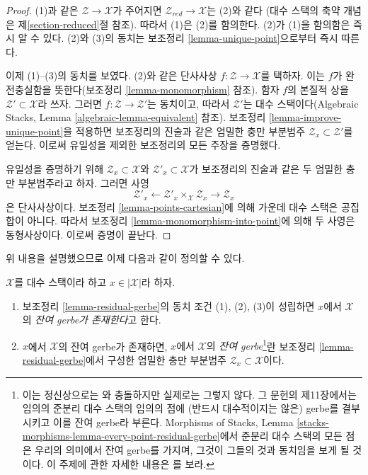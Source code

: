 \begin{proof}
(1)과 같은 $\mathcal{Z} \to \mathcal{X}$가 주어지면
$\mathcal{Z}_{red} \to \mathcal{X}$는 (2)와 같다
(대수 스택의 축약 개념은 제\ref{section-reduced}절 참조).
따라서 (1)은 (2)를 함의한다. (2)가 (1)을 함의함은 즉시 알 수 있다.
(2)와 (3)의 동치는 보조정리 \ref{lemma-unique-point}으로부터 즉시 따른다.

\medskip\noindent
이제 (1)--(3)의 동치를 보였다. (2)와 같은 단사사상
$f : \mathcal{Z} \to \mathcal{X}$를 택하자. 이는 $f$가 완전충실함을
뜻한다(보조정리 \ref{lemma-monomorphism} 참조).
함자 $f$의 본질적 상을 $\mathcal{Z}' \subset \mathcal{X}$라 쓰자.
그러면 $f : \mathcal{Z} \to \mathcal{Z}'$는 동치이고, 따라서
$\mathcal{Z}'$는 대수 스택이다(Algebraic Stacks,
Lemma \ref{algebraic-lemma-equivalent} 참조).
보조정리 \ref{lemma-improve-unique-point}을 적용하면 보조정리의 진술과 같은
엄밀한 충만 부분범주 $\mathcal{Z}_x \subset \mathcal{Z}'$를 얻는다.
이로써 유일성을 제외한 보조정리의 모든 주장을 증명했다.

\medskip\noindent
유일성을 증명하기 위해 $\mathcal{Z}_x \subset \mathcal{X}$와
$\mathcal{Z}'_x \subset \mathcal{X}$가 보조정리의 진술과 같은
두 엄밀한 충만 부분범주라고 하자. 그러면 사영
$$
\mathcal{Z}'_x
\longleftarrow
\mathcal{Z}'_x \times_\mathcal{X} \mathcal{Z}_x
\longrightarrow
\mathcal{Z}_x
$$
은 단사사상이다. 보조정리 \ref{lemma-points-cartesian}에 의해
가운데 대수 스택은 공집합이 아니다. 따라서 보조정리
\ref{lemma-monomorphism-into-point}에 의해 두 사영은 동형사상이다.
이로써 증명이 끝난다.
\end{proof}

\noindent
위 내용을 설명했으므로 이제 다음과 같이 정의할 수 있다.

\begin{definition}
\label{definition-residual-gerbe}
$\mathcal{X}$를 대수 스택이라 하고 $x \in |\mathcal{X}|$라 하자.
\begin{enumerate}
\item 보조정리 \ref{lemma-residual-gerbe}의 동치 조건 (1), (2), (3)이
성립하면 {$x$에서 $\mathcal{X}$의 \it 잔여 gerbe가 존재한다}고 한다.
\item $x$에서 $\mathcal{X}$의 잔여 gerbe가 존재하면,
{$x$에서 $\mathcal{X}$의 \it 잔여 gerbe}\footnote{이는 정신상으로는
\cite{LM-B}와 충돌하지만 실제로는 그렇지 않다. 그 문헌의 제11장에서는
임의의 준분리 대수 스택의 임의의 점에 (반드시 대수적이지는 않은) gerbe를
결부시키고 이를 잔여 gerbe라 부른다. Morphisms of Stacks,
Lemma \ref{stacks-morphisms-lemma-every-point-residual-gerbe}에서
준분리 대수 스택의 모든 점은 우리의 의미에서 잔여 gerbe를 가지며,
그것이 그들의 것과 동치임을 보게 될 것이다. 이 주제에 관한 자세한 내용은
\cite[Appendix B]{rydh_etale_devissage}를 보라.}란
보조정리 \ref{lemma-residual-gerbe}에서 구성한 엄밀한 충만 부분범주
$\mathcal{Z}_x \subset \mathcal{X}$이다.
\end{enumerate}
\end{definition}

